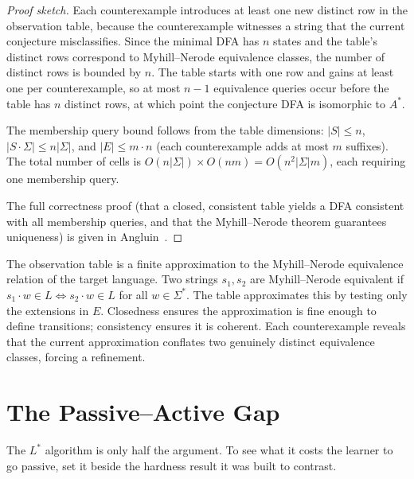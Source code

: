 \begin{proof}[Proof sketch]
Each counterexample introduces at least one new distinct row in the observation table, because the counterexample witnesses a string that the current conjecture misclassifies. Since the minimal DFA has $n$ states and the table's distinct rows correspond to Myhill--Nerode equivalence classes, the number of distinct rows is bounded by $n$. The table starts with one row and gains at least one per counterexample, so at most $n - 1$ equivalence queries occur before the table has $n$ distinct rows, at which point the conjecture DFA is isomorphic to $A^*$.

The membership query bound follows from the table dimensions: $|S| \leq n$, $|S \cdot \Sigma| \leq n|\Sigma|$, and $|E| \leq m \cdot n$ (each counterexample adds at most $m$ suffixes). The total number of cells is $O(n|\Sigma|) \times O(nm) = O(n^2 |\Sigma| m)$, each requiring one membership query.

The full correctness proof (that a closed, consistent table yields a DFA consistent with all membership queries, and that the Myhill--Nerode theorem guarantees uniqueness) is given in Angluin~\cite{Angluin1987}.
\end{proof}

\begin{remark}
\label{rmk:table-intuition}
The observation table is a finite approximation to the Myhill--Nerode equivalence relation of the target language. Two strings $s_1, s_2$ are Myhill--Nerode equivalent if $s_1 \cdot w \in L \iff s_2 \cdot w \in L$ for all $w \in \Sigma^*$. The table approximates this by testing only the extensions in $E$. Closedness ensures the approximation is fine enough to define transitions; consistency ensures it is coherent. Each counterexample reveals that the current approximation conflates two genuinely distinct equivalence classes, forcing a refinement.
\end{remark}


\section{The Passive--Active Gap}
\label{sec:passive-active-gap}

The $L^*$ algorithm is only half the argument. To see what it costs the learner to go passive, set it beside the hardness result it was built to contrast.

